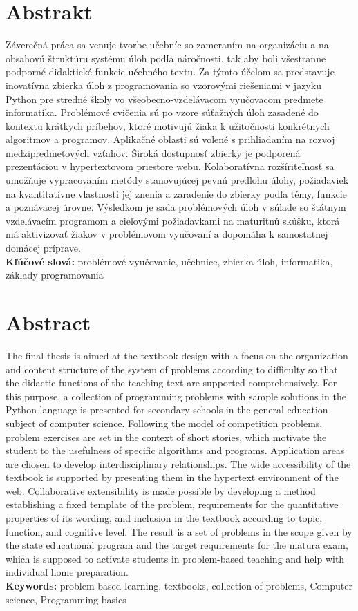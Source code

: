 \thispagestyle{empty}
\section*{Abstrakt}
Záverečná práca sa venuje tvorbe učebníc so zameraním na organizáciu a na obsahovú štruktúru systému úloh podľa náročnosti, tak aby boli všestranne podporné didaktické funkcie učebného textu. Za týmto účelom sa predstavuje inovatívna zbierka úloh z programovania so vzorovými riešeniami v jazyku Python pre stredné školy vo všeobecno-vzdelávacom vyučovacom predmete informatika. Problémové cvičenia sú po vzore súťažných úloh zasadené do kontextu krátkych príbehov, ktoré motivujú žiaka k užitočnosti konkrétnych algoritmov a programov. Aplikačné oblasti sú volené s prihliadaním na rozvoj medzipredmetových vzťahov. Široká dostupnosť zbierky je podporená prezentáciou v hypertextovom priestore webu. Kolaboratívna rozšíriteľnosť sa umožňuje vypracovaním metódy stanovujúcej pevnú predlohu úlohy, požiadaviek na kvantitatívne vlastnosti jej znenia a zaradenie do zbierky podľa témy, funkcie a poznávacej úrovne. Výsledkom je sada problémových úloh v súlade so štátnym vzdelávacím programom a cieľovými požiadavkami na maturitnú skúšku, ktorá má aktivizovať žiakov v problémovom vyučovaní a dopomáha k samostatnej domácej príprave. \\

\textbf{Kľúčové slová:} problémové vyučovanie, učebnice, zbierka úloh, informatika, základy programovania

\emptypage

\thispagestyle{empty}
\section*{Abstract}
The final thesis is aimed at the textbook design with a focus on the organization and content structure of the system of problems according to difficulty so that the didactic functions of the teaching text are supported comprehensively. For this purpose, a collection of programming problems with sample solutions in the Python language is presented for secondary schools in the general education subject of computer science. Following the model of competition problems, problem exercises are set in the context of short stories, which motivate the student to the usefulness of specific algorithms and programs. Application areas are chosen to develop interdisciplinary relationships. The wide accessibility of the textbook is supported by presenting them in the hypertext environment of the web. Collaborative extensibility is made possible by developing a method establishing a fixed template of the problem, requirements for the quantitative properties of its wording, and inclusion in the textbook according to topic, function, and cognitive level.
The result is a set of problems in the scope given by the state educational program and the target requirements for the matura exam, which is supposed to activate students in problem-based teaching and help with individual home preparation. \\

\textbf{Keywords:} problem-based learning, textbooks, collection of problems, Computer science, Programming basics
\emptypage 